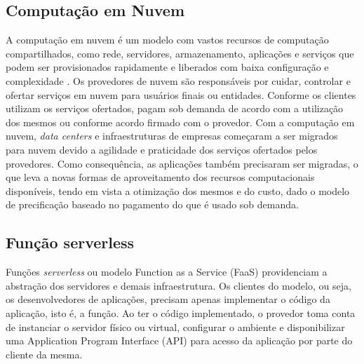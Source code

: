 \documentclass[conference]{IEEEtran}
\begin{document}
\subsection{Computação em Nuvem}
\label{subsec:cloud}

A computação em nuvem é um modelo com vastos recursos de computação compartilhados, como rede, servidores, armazenamento, aplicações e serviços que podem ser provisionados rapidamente e liberados com baixa configuração e complexidade \cite{nist_2011_cloud_computing}.
Os provedores de nuvem são responsáveis por cuidar, controlar e ofertar serviços em nuvem para usuários finais ou entidades. Conforme os clientes utilizam os serviços ofertados, pagam sob demanda de acordo com a utilização dos mesmos ou conforme acordo firmado com o provedor. Com a computação em nuvem, \textit{data centers} e infraestruturas de empresas começaram a ser migrados para nuvem devido a agilidade e praticidade dos serviços ofertados pelos provedores. Como consequência, as aplicações também precisaram ser migradas, o que leva a novas formas de aproveitamento dos recursos computacionais disponíveis, tendo em vista a otimização dos mesmos e do custo, dado o modelo de precificação baseado no pagamento do que é usado sob demanda.

\subsection{Função serverless}
\label{subsec:serverless_funcion}

Funções \textit{serverless} ou modelo Function as a Service (FaaS) providenciam a abstração dos servidores e demais infraestrutura. Os clientes do modelo, ou seja, os desenvolvedores de aplicações, precisam apenas implementar o código da aplicação, isto é, a função. Ao ter o código implementado, o provedor toma conta de instanciar o servidor físico ou virtual, configurar o ambiente e disponibilizar uma Application Program Interface (API) para acesso da aplicação por parte do cliente da mesma. 
\end{document}

